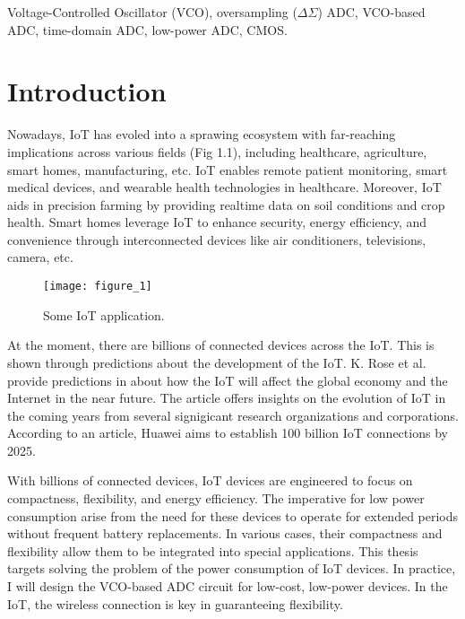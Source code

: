 \documentclass[journal]{IEEEtran}
\begin{document}
\begin{IEEEkeywords}
Voltage-Controlled Oscillator (VCO), oversampling (${\Delta\Sigma}$) ADC, VCO-based ADC, time-domain ADC, low-power ADC, CMOS.
\end{IEEEkeywords}

\IEEEpeerreviewmaketitle
\section{Introduction}
\setlength{\parindent}{10pt}
Nowadays, IoT has evoled into a sprawing ecosystem with far-reaching implications across various fields (Fig 1.1), including healthcare, agriculture, smart homes, manufacturing, etc. IoT enables remote patient monitoring, smart medical devices, and wearable health technologies in healthcare. Moreover, IoT aids in precision farming by providing realtime data on soil conditions and crop health. Smart homes leverage IoT to enhance security, energy efficiency, and convenience through interconnected devices like air conditioners, televisions, camera, etc.\\

\begin{figure}[h]
\texttt{[image: figure\_1]}
\caption{Some IoT application.}
\label{fig:figure2}
\end{figure}

\setlength{\parindent}{10pt}
At the moment, there are billions of connected devices across the IoT. This is shown through predictions about the development of the IoT. K. Rose et al. provide predictions in \cite{rose2015internet} about how the IoT will affect the global economy and the Internet in the near future. The article offers insights on the evolution of IoT in the coming years from several signigicant research organizations and corporations. According to an article, Huawei aims to establish 100 billion IoT connections by 2025. 

\setlength{\parindent}{10pt}
With billions of connected devices, IoT devices are engineered to focus on compactness, flexibility, and energy efficiency. The imperative for low power consumption arise from the need for these devices to operate for extended periods without frequent battery replacements. In various cases, their compactness and flexibility allow them to be integrated into special applications. This thesis targets solving the problem of the power consumption of IoT devices. In practice, I will design the VCO-based ADC circuit for low-cost, low-power devices. In the IoT, the wireless connection is key in guaranteeing flexibility. 
\end{document}
